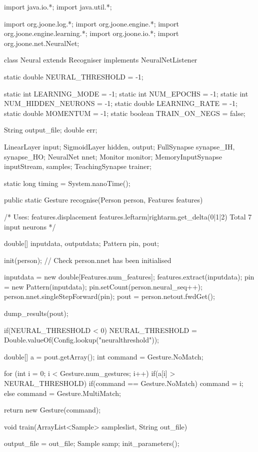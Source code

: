 \documentclass[12pt,a4,notitlepage]{report}
\renewcommand{\_}{\texttt{\symbol{95}}}
\newcommand{\<}{\texttt{\symbol{60}}}
\renewcommand{\>}{\texttt{\symbol{62}}}
\begin{document}
\begin{code}
import java.io.*;
import java.util.*;

import org.joone.log.*;
import org.joone.engine.*;
import org.joone.engine.learning.*;
import org.joone.io.*;
import org.joone.net.NeuralNet;

class Neural extends Recogniser implements NeuralNetListener 
{
	static double NEURAL_THRESHOLD = -1;

	static int LEARNING_MODE = -1;
	static int NUM_EPOCHS = -1;
	static int NUM_HIDDEN_NEURONS = -1;
	static double LEARNING_RATE = -1;
	static double MOMENTUM = -1;
	static boolean TRAIN_ON_NEGS = false;
	
	String output_file;
	double err;
	
	LinearLayer input;
	SigmoidLayer hidden, output;
	FullSynapse synapse_IH, synapse_HO;
	NeuralNet nnet;
	Monitor monitor;
	MemoryInputSynapse inputStream, samples;
	TeachingSynapse trainer;
	
	static long timing = System.nanoTime();

	public static Gesture recognise(Person person, Features features)
	{		
		/* Uses:
			features.displacement
			features.leftarm|rightarm.get_delta(0|1|2)
			Total 7 input neurons
		*/
		
		double[] inputdata, outputdata;
		Pattern pin, pout;
		
		init(person); // Check person.nnet has been initialised

		inputdata = new double[Features.num_features];
		features.extract(inputdata);
		pin = new Pattern(inputdata);
		pin.setCount(person.neural_seq++);
		person.nnet.singleStepForward(pin);
		pout = person.netout.fwdGet();
		
		dump_results(pout);
				
		if(NEURAL_THRESHOLD < 0)
			NEURAL_THRESHOLD = Double.valueOf(Config.lookup("neuralthreshold"));
		
		
		double[] a = pout.getArray();
		int command = Gesture.NoMatch;
				
		for (int i = 0; i < Gesture.num_gestures; i++)
		{
			if(a[i] > NEURAL_THRESHOLD)
			{
				if(command == Gesture.NoMatch)
					command = i;
				else
					command = Gesture.MultiMatch;
			}
		}
		
		return new Gesture(command);

	}
		
	void train(ArrayList<Sample> sampleslist, String out_file)
	{

		output_file = out_file;
		Sample samp;
		init_parameters();
		
}}
\end{code}
\end{document}
